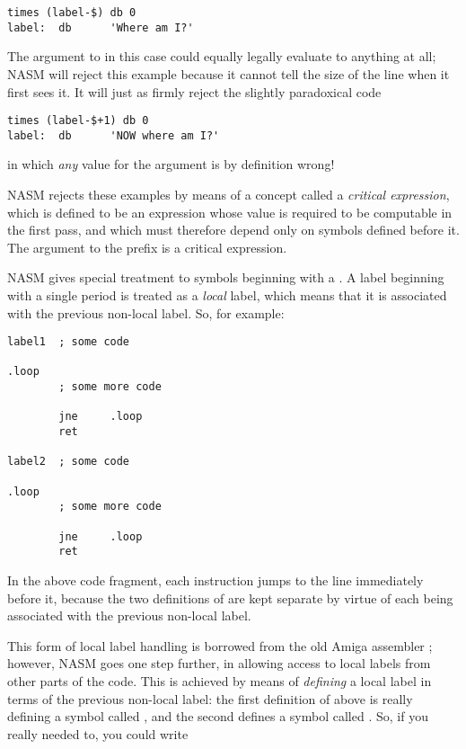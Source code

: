 \begin{lstlisting}
times (label-$) db 0
label:	db      'Where am I?'
\end{lstlisting}

The argument to  in this case could equally legally
evaluate to anything at all; NASM will reject this example because
it cannot tell the size of the  line when it first sees it.
It will just as firmly reject the slightly paradoxical
code

\begin{lstlisting}
times (label-$+1) db 0
label:  db      'NOW where am I?'
\end{lstlisting}

in which \emph{any} value for the  argument
is by definition wrong!

NASM rejects these examples by means of a concept called a
\emph{critical expression}, which is defined to be an
expression whose value is required to be computable in
the first pass, and which must therefore depend only
on symbols defined before it. The argument to the 
prefix is a critical expression.


NASM gives special treatment to symbols beginning with a .
A label beginning with a single period is treated as a \emph{local}
label, which means that it is associated with the previous non-local
label. So, for example:

\begin{lstlisting}
label1  ; some code

.loop
        ; some more code

        jne     .loop
        ret

label2  ; some code

.loop
        ; some more code

        jne     .loop
        ret
\end{lstlisting}

In the above code fragment, each  instruction jumps to the
line immediately before it, because the two definitions of
 are kept separate by virtue of each being associated
with the previous non-local label.

This form of local label handling is borrowed from the old Amiga
assembler ; however, NASM goes one step further,
in allowing access to local labels from other parts of the code. This
is achieved by means of \emph{defining} a local label in terms of the
previous non-local label: the first definition of  above is
really defining a symbol called , and the second
defines a symbol called . So, if you really needed
to, you could write

